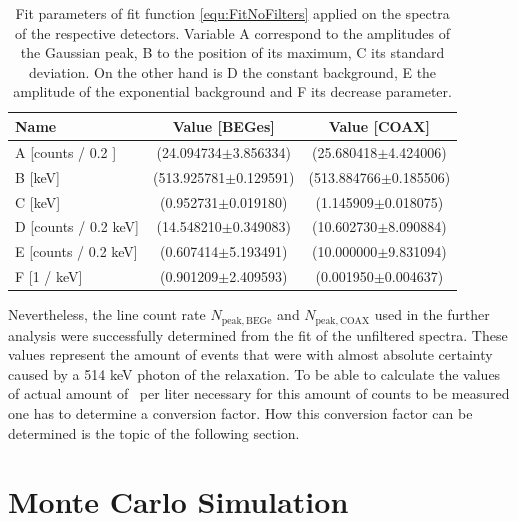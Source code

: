 \documentclass[encoding=utf8,british]{tumphthesis}
\begin{document}
\begin{table}[t!]
	\centering
	\begin{tabular}{|l|c|c|}
		\hline
		Name	& Value [BEGes] & Value [COAX]\\ 
		\hline
		A [counts  / 0.2 ] &	(24.094734$\pm$3.856334)&	(25.680418$\pm$4.424006)\\	
		\hline
		B [keV] &	(513.925781$\pm$0.129591)&	(513.884766$\pm$0.185506)\\	
		\hline
		C [keV] &	(0.952731$\pm$0.019180)	&	(1.145909$\pm$0.018075)\\
		\hline
		D [counts / 0.2 keV] &	(14.548210$\pm$0.349083)	&	(10.602730$\pm$8.090884)\\
		\hline
		E [counts / 0.2 keV] &	(0.607414$\pm$5.193491)	&	(10.000000$\pm$9.831094)\\
		\hline	
		F [1 / keV] &	(0.901209$\pm$2.409593)	&	(0.001950$\pm$0.004637)\\
		\hline
	\end{tabular}
	\caption{
		Fit parameters of fit function \ref{equ:FitNoFilters} applied on the spectra of the respective detectors. 
		Variable A correspond to the amplitudes of the Gaussian peak, B to the position of its maximum, C its standard deviation. 
		On the other hand is D the constant background, E the amplitude of the exponential background and F its decrease parameter.
		}
			\label{tab:FitParFilter}

\end{table}

Nevertheless, the line count rate $N_{\mathrm{peak,BEGe}}$ and $N_{\mathrm{peak,COAX}}$ used in the further analysis were successfully determined from the fit of the unfiltered spectra.
These values represent the amount of events that were with almost absolute certainty caused by a 514 keV photon of the  relaxation.  
To be able to calculate the values of actual amount of \Kr\ per liter necessary for this amount of counts to be measured one has to determine a conversion factor. 
How this conversion factor can be determined is the topic of the following section.
\\

\section{Monte Carlo Simulation}
\label{sec:MonteCarlo514}
\end{document}
